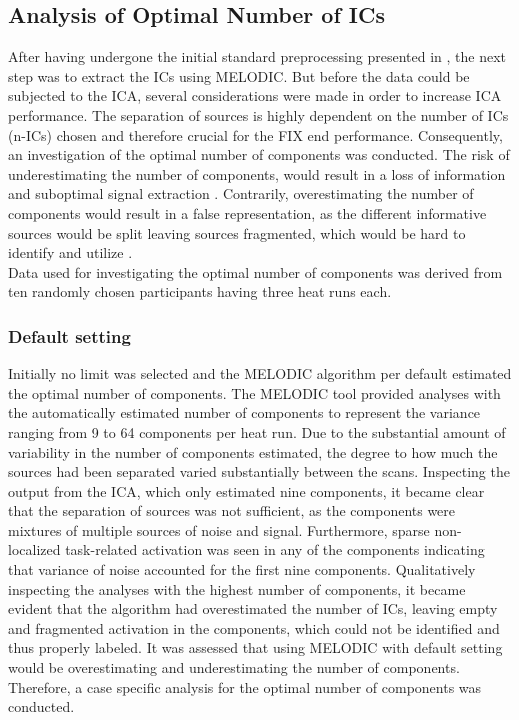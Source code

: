
\subsection{Analysis of Optimal Number of ICs} \label{sec:optimal}

After having undergone the initial standard preprocessing presented in , the next step was to extract the ICs using MELODIC. But before the data could be subjected to the ICA, several considerations were made in order to increase ICA performance. The separation of sources is highly dependent on the number of ICs (n-ICs) chosen and therefore crucial for the FIX end performance. Consequently, an investigation of the optimal number of components was conducted. The risk of underestimating the number of components, would result in a loss of information and suboptimal signal extraction \cite{Beckmann2004}. Contrarily, overestimating the number of components would result in a false representation, as the different informative sources would be split leaving sources fragmented, which would be hard to identify and utilize \cite{Beckmann2004,Li2007}. \\
Data used for investigating the optimal number of components was derived from ten randomly chosen participants having three heat runs each. 


\subsubsection{Default setting}
Initially no limit was selected and the MELODIC algorithm per default estimated the optimal number of components. \cite{FMRIB2016} The MELODIC tool provided analyses with the automatically estimated number of components to represent the variance ranging from 9 to 64 components per heat run. Due to the substantial amount of variability in the number of components estimated, the degree to how much the sources had been separated varied substantially between the scans. Inspecting the output from the ICA, which only estimated nine components, it became clear that the separation of sources was not sufficient, as the components were mixtures of multiple sources of noise and signal. Furthermore, sparse non-localized task-related activation was seen in any of the components indicating that variance of noise accounted for the first nine components. Qualitatively inspecting the analyses with the highest number of components, it became evident that the algorithm had overestimated the number of ICs, leaving empty and fragmented activation in the components, which could not be identified and thus properly labeled. It was assessed that using MELODIC with default setting would be overestimating and underestimating the number of components. Therefore, a case specific analysis for the optimal number of components was conducted. 

